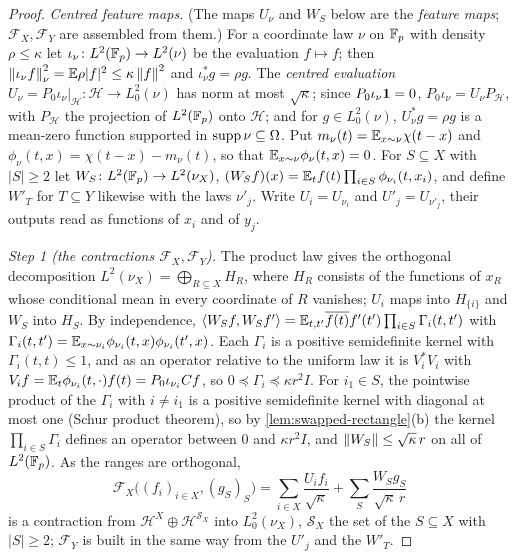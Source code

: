\begin{proof}
\emph{Centred feature maps.} (The maps $U_\nu$ and $W_S$ below
are the \emph{feature maps}; $\mathcal F_X,\mathcal F_Y$ are
assembled from them.) For a coordinate law $\nu$ on $\mathbb F_p$ with
density $\rho\le\kappa$ let
$\iota_\nu\colon L^2(\mathbb F_p)\to L^2(\nu)$ be the evaluation $f\mapsto f$; then
$\left\|\iota_\nu f\right\|^2_\nu=\mathbb E\rho |f|^2\le\kappa\left\|f\right\|^2$ and $\iota_\nu^*g=\rho g$. The
\emph{centred evaluation} $U_\nu=P_0\iota_\nu|_{\mathcal H}\colon\mathcal H\to L^2_0(\nu)$
has norm at most $\sqrt\kappa$; since $P_0\iota_\nu\mathbf 1=0$,
$P_0\iota_\nu=U_\nu P_{\mathcal H}$, with $P_{\mathcal H}$ the projection of $L^2(\mathbb F_p)$
onto $\mathcal H$; and for $g\in L^2_0(\nu)$, $U_\nu^*g=\rho g$ is a mean-zero function
supported in $\operatorname{supp}\nu\subseteq\Omega$. Put $m_\nu(t)=\mathbb E_{x\sim\nu}\chi(t-x)$ and
$\phi_\nu(t,x)=\chi(t-x)-m_\nu(t)$, so that $\mathbb E_{x\sim\nu}\phi_\nu(t,x)=0$. For
$S\subseteq X$ with $|S|\ge2$ let $W_S\colon L^2(\mathbb F_p)\to L^2(\nu_X)$,
$(W_Sf)(x)=\mathbb E_tf(t)\prod_{i\in S}\phi_{\nu_i}(t,x_i)$, and define $W'_T$ for
$T\subseteq Y$ likewise with the laws $\nu'_j$. Write $U_i=U_{\nu_i}$ and
$U'_j=U_{\nu'_j}$, their outputs read as functions of $x_i$ and of $y_j$.

\emph{Step 1 (the contractions $\mathcal F_X,\mathcal F_Y$).} The product law gives the orthogonal decomposition
$L^2(\nu_X)=\bigoplus_{R\subseteq X}H_R$, where $H_R$ consists of the functions of
$x_R$ whose conditional mean in every coordinate of $R$ vanishes; $U_i$ maps into
$H_{\{i\}}$ and $W_S$ into $H_S$. By independence,
$\left\langle W_Sf,W_Sf'\right\rangle=\mathbb E_{t,t'}\overline{f(t)}f'(t')\prod_{i\in S}\Gamma_i(t,t')$ with
$\Gamma_i(t,t')=\mathbb E_{x\sim\nu_i}\phi_{\nu_i}(t,x)\phi_{\nu_i}(t',x)$. Each $\Gamma_i$ is a
positive semidefinite kernel with $\Gamma_i(t,t)\le1$, and as an operator relative to
the uniform law it is $V_i^*V_i$ with
$V_if=\mathbb E_t\phi_{\nu_i}(t,\cdot)f(t)=P_0\iota_{\nu_i}Cf$, so $0\preceq\Gamma_i\preceq\kappa
r^2I$. For $i_1\in S$, the pointwise product of the $\Gamma_i$ with $i\ne i_1$ is a
positive semidefinite kernel with diagonal at most one (Schur product theorem), so by
\cref{lem:swapped-rectangle}(b) the kernel $\prod_{i\in S}\Gamma_i$ defines an operator
between $0$ and $\kappa r^2I$, and $\left\|W_S\right\|\le\sqrt\kappa\,r$ on all of $L^2(\mathbb F_p)$.
As the ranges are orthogonal,
\[
 \mathcal F_X\bigl((f_i)_{i\in X},(g_S)_S\bigr)=\sum_{i\in X}\frac{U_if_i}{\sqrt\kappa}
 +\sum_S\frac{W_Sg_S}{\sqrt\kappa\,r}
\]
is a contraction from $\mathcal H^X\oplus\mathcal H^{\mathcal S_X}$ into $L^2_0(\nu_X)$,
$\mathcal S_X$ the set of the $S\subseteq X$ with $|S|\ge2$; $\mathcal F_Y$ is built in
the same way from the $U'_j$ and the $W'_T$.


\end{proof}
